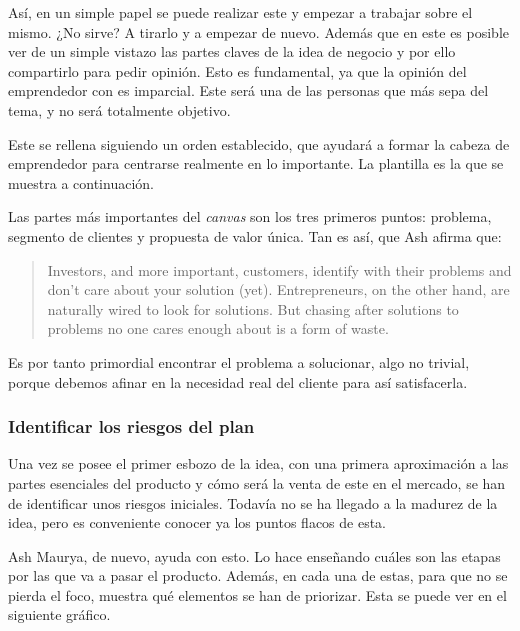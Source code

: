 Así, en un simple papel se puede realizar este y empezar a trabajar sobre el mismo. ¿No sirve? A tirarlo y a empezar de nuevo. Además que en este es posible ver de un simple vistazo las partes claves de la idea de negocio y por ello compartirlo para pedir opinión. Esto es fundamental, ya que la opinión del emprendedor con es imparcial. Este será una de las personas que más sepa del tema, y no será totalmente objetivo.

Este se rellena siguiendo un orden establecido, que ayudará a formar la cabeza de emprendedor para centrarse realmente en lo importante. La plantilla es la que se muestra a continuación.


Las partes más importantes del \textit{canvas} son los tres primeros puntos: problema, segmento de clientes y propuesta de valor única. Tan es así, que Ash afirma que:

\begin{quote}
	\small Investors, and more important, customers, identify with their problems and don't care about your solution (yet). Entrepreneurs, on the other hand, are naturally wired to look for solutions. But chasing after solutions to problems no one cares enough about is a form of waste.
	\begin{flushright}
	\end{flushright}
\end{quote}

Es por tanto primordial encontrar el problema a solucionar, algo no trivial, porque debemos afinar en la necesidad real del cliente para así satisfacerla.

\subsubsection{Identificar los riesgos del plan}

Una vez se posee el primer esbozo de la idea, con una primera aproximación a las partes esenciales del producto y cómo será la venta de este en el mercado, se han de identificar unos riesgos iniciales. Todavía no se ha llegado a la madurez de la idea, pero es conveniente conocer ya los puntos flacos de esta.

Ash Maurya, de nuevo, ayuda con esto. Lo hace enseñando cuáles son las etapas por las que va a pasar el producto. Además, en cada una de estas, para que no se pierda el foco, muestra qué elementos se han de priorizar. Esta se puede ver en el siguiente gráfico.

